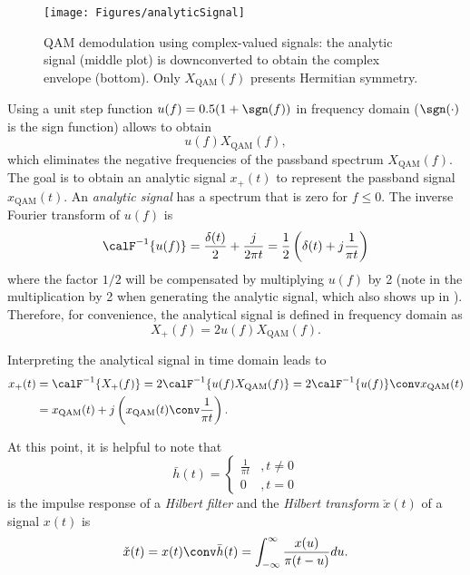 \begin{figure}[htbp]
\centering
\texttt{[image: Figures/analyticSignal]}
\caption{QAM demodulation using complex-valued signals: the analytic signal (middle plot) is downconverted to obtain the complex envelope (bottom). Only $X_{\textrm{QAM}}(f)$ presents Hermitian symmetry.\label{fig:analyticSignal}}
\end{figure}

Using a unit step function $u(f) = 0.5(1+\sgn(f))$ in frequency domain ($\sgn(\cdot)$ is the sign function) allows to obtain
$$
u(f) X_{\textrm{QAM}}(f),
$$
which eliminates the negative frequencies of the passband spectrum $X_{\textrm{QAM}}(f)$. The goal is to obtain an analytic signal $x_{+}(t)$ to represent the passband signal $x_{\textrm{QAM}}(t)$. 
An \emph{analytic signal} has a spectrum that is zero for $f \le 0$. The inverse Fourier transform of $u(f)$ is
\[
\calF^{-1}\{u(f)\} = \frac{\delta(t)}{2} + \frac{j}{2 \pi t} = \frac{1}{2} \left( \delta(t) + j \frac{1}{\pi t} \right) %
\]
where the factor $1/2$ will be compensated by multiplying $u(f)$ by 2 (note in  the multiplication by 2 when generating the analytic signal, which also shows up in ).
Therefore, for convenience, the analytical signal is defined in frequency domain as
\begin{equation}
X_{+}(f) = 2 u(f) X_{\textrm{QAM}}(f).
\label{eq:qamAnalytic}
\end{equation} 

Interpreting the analytical signal in time domain leads to
\begin{align}
x_{+}(t) & = \calF^{-1} \{ X_{+}(f) \} = 2 \calF^{-1} \{u(f) X_{\textrm{QAM}}(f) \} = 2 \calF^{-1}\{u(f)\} \conv x_{\textrm{QAM}}(t) \notag \\
  & = x_{\textrm{QAM}}(t) + j \left( x_{\textrm{QAM}}(t) \conv \frac{1}{\pi t} \right).
\end{align}

At this point, it is helpful to note that
\[
\bar h(t) = \left\{ {\begin{array}{cc} {\frac 1 {\pi t}} & {, t \ne 0}\\ 0 & {, t=0} \end{array}  } \right.
\]
is the impulse response of a \emph{Hilbert filter} and the \emph{Hilbert transform} $\check{x}(t)$ of a signal $x(t)$ is
\[
\check{x}(t) = x(t) \conv \bar h(t) = \int_{- \infty}^\infty \frac{x(u)}{\pi (t - u)} du.
\]

